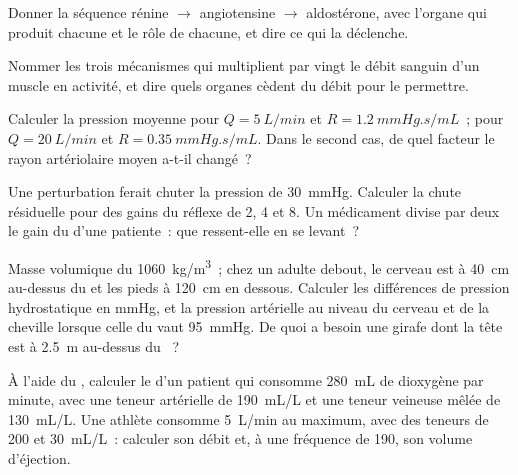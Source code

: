 \begin{exercise}[$\star$]\label{exo:b2:blood-pressure:3}
Donner la séquence rénine $\to$ angiotensine $\to$ aldostérone, avec
l'organe qui produit chacune et le rôle de chacune, et dire ce qui la
déclenche.
\end{exercise}

\begin{exercise}[$\star$]\label{exo:b2:blood-pressure:4}
Nommer les trois mécanismes qui multiplient par vingt le débit sanguin
d'un muscle en activité, et dire quels organes cèdent du débit pour le
permettre.
\end{exercise}

\begin{exercise}[$\star\star$]\label{exo:b2:blood-pressure:5}
Calculer la pression moyenne pour $Q = \qty{5}{L/min}$ et $R =
\qty{1.2}{mmHg.s/mL}$~; pour $Q = \qty{20}{L/min}$ et $R =
\qty{0.35}{mmHg.s/mL}$. Dans le second cas, de quel facteur le rayon
artériolaire moyen a-t-il changé~?
\end{exercise}

\begin{exercise}[$\star\star$]\label{exo:b2:blood-pressure:6}
Une perturbation ferait chuter la pression de \qty{30}{mmHg}. Calculer
la chute résiduelle pour des gains du réflexe de 2, 4 et 8. Un
médicament divise par deux le gain du  d'une patiente~: que
ressent-elle en se levant~?
\end{exercise}

\begin{exercise}[$\star\star$]\label{exo:b2:blood-pressure:7}
Masse volumique du  \qty{1060}{kg/m^3}~; chez un adulte debout, le
cerveau est à \qty{40}{cm} au-dessus du  et les pieds à
\qty{120}{cm} en dessous. Calculer les différences de pression
hydrostatique en mmHg, et la pression artérielle au niveau du cerveau et
de la cheville lorsque celle du  vaut \qty{95}{mmHg}. De quoi a
besoin une girafe dont la tête est à \qty{2.5}{m} au-dessus du ~?
\end{exercise}

\begin{exercise}[$\star\star$]\label{exo:b2:blood-pressure:8}
À l'aide du , calculer le  d'un patient
qui consomme \qty{280}{mL} de dioxygène par minute, avec une teneur
artérielle de \qty{190}{mL/L} et une teneur veineuse mêlée de
\qty{130}{mL/L}. Une athlète consomme \qty{5}{L/min} au maximum, avec des
teneurs de 200 et
\qty{30}{mL/L}~: calculer son débit et, à une fréquence de 190, son
volume d'éjection.
\end{exercise}

